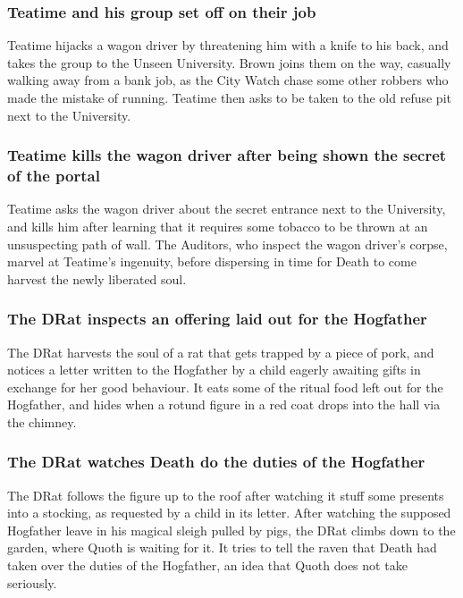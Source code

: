 \subsubsection{\Gls{Teatime} and his group set off on their job}
\Gls{Teatime} hijacks a wagon driver by threatening him with a knife to his back, and takes the
group to the Unseen University. \Gls{Brown} joins them on the way, casually walking away from a
bank job, as the City Watch chase some other robbers who made the mistake of running. \Gls{Teatime}
then asks to be taken to the old refuse pit next to the University.

\subsubsection{\Gls{Teatime} kills the wagon driver after being shown the secret of the portal}
\Gls{Teatime} asks the wagon driver about the secret entrance next to the University, and kills him
after learning that it requires some tobacco to be thrown at an unsuspecting path of wall. The
Auditors, who inspect the wagon driver's corpse, marvel at \Gls{Teatime}'s ingenuity, before
dispersing in time for \Gls{Death} to come harvest the newly liberated soul.

\subsubsection{The \Gls{DRat} inspects an offering laid out for the Hogfather}
The \Gls{DRat} harvests the soul of a rat that gets trapped by a piece of pork, and notices a
letter written to the Hogfather by a child eagerly awaiting gifts in exchange for her good
behaviour. It eats some of the ritual food left out for the Hogfather, and hides when a rotund
figure in a red coat drops into the hall via the chimney.

\subsubsection{The \Gls{DRat} watches \Gls{Death} do the duties of the Hogfather}
The \Gls{DRat} follows the figure up to the roof after watching it stuff some presents into a
stocking, as requested by a child in its letter. After watching the supposed Hogfather leave in
his magical sleigh pulled by pigs, the \Gls{DRat} climbs down to the garden, where \Gls{Quoth}
is waiting for it. It tries to tell the raven that \Gls{Death} had taken over the duties of the
Hogfather, an idea that \Gls{Quoth} does not take seriously.

